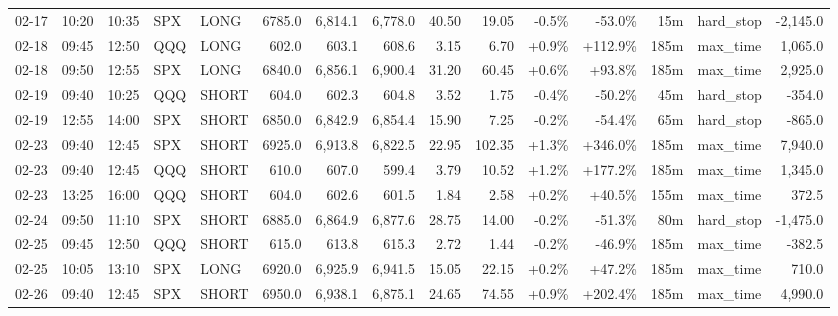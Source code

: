 \documentclass[11pt,a4paper,twoside]{article}
\begin{document}
\begin{landscape}
\begin{center}
\begin{longtable}{>{\color{txtmain}}l l l l l r r r r r r r r >{\color{txtmain}}l r}
02-17 & 10:20 & 10:35 & SPX & LONG & 6785.0 & 6,814.1 & 6,778.0 & 40.50 & 19.05 & \textcolor{lossred}{-0.5\%} & \textcolor{lossred}{-53.0\%} & 15m & hard\_stop & \textcolor{lossred}{-2,145.0} \\
02-18 & 09:45 & 12:50 & QQQ & LONG & 602.0 & 603.1 & 608.6 & 3.15 & 6.70 & \textcolor{wingreen}{+0.9\%} & \textcolor{wingreen}{+112.9\%} & 185m & max\_time & \textcolor{wingreen}{1,065.0} \\
02-18 & 09:50 & 12:55 & SPX & LONG & 6840.0 & 6,856.1 & 6,900.4 & 31.20 & 60.45 & \textcolor{wingreen}{+0.6\%} & \textcolor{wingreen}{+93.8\%} & 185m & max\_time & \textcolor{wingreen}{2,925.0} \\
02-19 & 09:40 & 10:25 & QQQ & SHORT & 604.0 & 602.3 & 604.8 & 3.52 & 1.75 & \textcolor{lossred}{-0.4\%} & \textcolor{lossred}{-50.2\%} & 45m & hard\_stop & \textcolor{lossred}{-354.0} \\
02-19 & 12:55 & 14:00 & SPX & SHORT & 6850.0 & 6,842.9 & 6,854.4 & 15.90 & 7.25 & \textcolor{lossred}{-0.2\%} & \textcolor{lossred}{-54.4\%} & 65m & hard\_stop & \textcolor{lossred}{-865.0} \\
02-23 & 09:40 & 12:45 & SPX & SHORT & 6925.0 & 6,913.8 & 6,822.5 & 22.95 & 102.35 & \textcolor{wingreen}{+1.3\%} & \textcolor{wingreen}{+346.0\%} & 185m & max\_time & \textcolor{wingreen}{7,940.0} \\
02-23 & 09:40 & 12:45 & QQQ & SHORT & 610.0 & 607.0 & 599.4 & 3.79 & 10.52 & \textcolor{wingreen}{+1.2\%} & \textcolor{wingreen}{+177.2\%} & 185m & max\_time & \textcolor{wingreen}{1,345.0} \\
02-23 & 13:25 & 16:00 & QQQ & SHORT & 604.0 & 602.6 & 601.5 & 1.84 & 2.58 & \textcolor{wingreen}{+0.2\%} & \textcolor{wingreen}{+40.5\%} & 155m & max\_time & \textcolor{wingreen}{372.5} \\
02-24 & 09:50 & 11:10 & SPX & SHORT & 6885.0 & 6,864.9 & 6,877.6 & 28.75 & 14.00 & \textcolor{lossred}{-0.2\%} & \textcolor{lossred}{-51.3\%} & 80m & hard\_stop & \textcolor{lossred}{-1,475.0} \\
02-25 & 09:45 & 12:50 & QQQ & SHORT & 615.0 & 613.8 & 615.3 & 2.72 & 1.44 & \textcolor{lossred}{-0.2\%} & \textcolor{lossred}{-46.9\%} & 185m & max\_time & \textcolor{lossred}{-382.5} \\
02-25 & 10:05 & 13:10 & SPX & LONG & 6920.0 & 6,925.9 & 6,941.5 & 15.05 & 22.15 & \textcolor{wingreen}{+0.2\%} & \textcolor{wingreen}{+47.2\%} & 185m & max\_time & \textcolor{wingreen}{710.0} \\
02-26 & 09:40 & 12:45 & SPX & SHORT & 6950.0 & 6,938.1 & 6,875.1 & 24.65 & 74.55 & \textcolor{wingreen}{+0.9\%} & \textcolor{wingreen}{+202.4\%} & 185m & max\_time & \textcolor{wingreen}{4,990.0} \\

\end{longtable}
\end{center}
\end{landscape}
\end{document}
